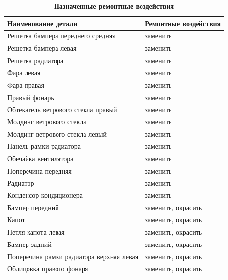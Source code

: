 {\small \begin{table}[H]
		\begin{longtable}{@{}ll@{}}
			\caption[]{\footnotesize {\textbf{Назначенные ремонтные воздействия}}} \label{tab:2}\\ 
			\toprule
			\textbf{Наименование детали}                      & \textbf{Ремонтные воздействия}\\ \midrule
			Решетка бампера переднего средняя        & заменить             \\
			Решетка бампера левая                    & заменить             \\
			Решетка радиатора                        & заменить             \\
			Фара левая                               & заменить             \\
			Фара правая                              & заменить             \\
			Правый фонарь                            & заменить             \\
			Обтекатель ветрового стекла правый       & заменить             \\
			Молдинг ветрового стекла                 & заменить             \\
			Молдинг ветрового стекла левый           & заменить             \\
			Панель рамки радиатора                   & заменить             \\
			Обечайка вентилятора                     & заменить             \\
			Поперечина передняя                      & заменить             \\
			Радиатор                                 & заменить             \\
			Конденсор кондиционера                   & заменить             \\
			Бампер передний                          & заменить, окрасить   \\
			Капот                                    & заменить, окрасить   \\
			Петля капота левая                       & заменить, окрасить   \\
			Бампер задний                            & заменить, окрасить   \\
			Поперечина рамки радиатора верхняя левая & заменить, окрасить   \\
			Облицовка правого фонаря                 & заменить, окрасить   \\

\end{longtable}
\end{table}}
